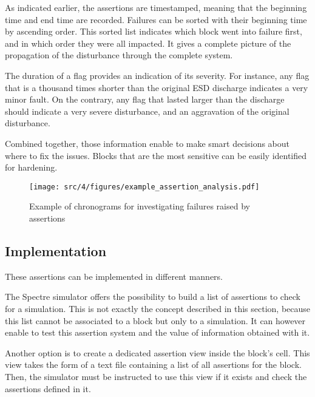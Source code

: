 As indicated earlier, the assertions are timestamped, meaning that the beginning time and end time are recorded.
Failures can be sorted with their beginning time by ascending order.
This sorted list indicates which block went into failure first, and in which order they were all impacted.
It gives a complete picture of the propagation of the disturbance through the complete system.

The duration of a flag provides an indication of its severity.
For instance, any flag that is a thousand times shorter than the original \gls{ESD} discharge indicates a very minor fault.
On the contrary, any flag that lasted larger than the discharge should indicate a very severe disturbance, and an aggravation of the original disturbance.

Combined together, those information enable to make smart decisions about where to fix the issues.
Blocks that are the most sensitive can be easily identified for hardening.

\begin{figure}[!h]
  \centering
  \texttt{[image: src/4/figures/example\_assertion\_analysis.pdf]}
  \caption{Example of chronograms for investigating failures raised by assertions}
  \label{fig:ex-special-cells}
\end{figure}


\subsection{Implementation}

These assertions can be implemented in different manners.

The Spectre simulator offers the possibility to build a list of assertions to check for a simulation.
This is not exactly the concept described in this section, because this list cannot be associated to a block but only to a simulation.
It can however enable to test this assertion system and the value of information obtained with it.

Another option is to create a dedicated assertion view inside the block's cell.
This view takes the form of a text file containing a list of all assertions for the block.
Then, the simulator must be instructed to use this view if it exists and check the assertions defined in it.

